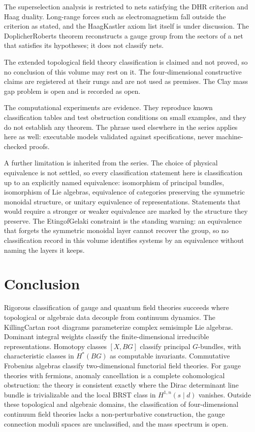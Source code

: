 \documentclass[11pt,letterpaper]{article}
\theoremstyle{definition}
\theoremstyle{remark}
\begin{document}
The superselection analysis is restricted to nets satisfying the DHR criterion and Haag duality. Long-range forces such as electromagnetism fall outside the criterion as stated, and the Haag\textendash{}Kastler axiom list itself is under discussion. The Doplicher\textendash{}Roberts theorem reconstructs a gauge group from the sectors of a net that satisfies its hypotheses; it does not classify nets.

The extended topological field theory classification is claimed and not proved, so no conclusion of this volume may rest on it. The four-dimensional constructive claims are registered at their rungs and are not used as premises. The Clay mass gap problem is open and is recorded as open.

The computational experiments are evidence. They reproduce known classification tables and test obstruction conditions on small examples, and they do not establish any theorem. The phrase used elsewhere in the series applies here as well: executable models validated against specifications, never machine-checked proofs.

A further limitation is inherited from the series. The choice of physical equivalence is not settled, so every classification statement here is classification up to an explicitly named equivalence: isomorphism of principal bundles, isomorphism of Lie algebras, equivalence of categories preserving the symmetric monoidal structure, or unitary equivalence of representations. Statements that would require a stronger or weaker equivalence are marked by the structure they preserve. The Etingof\textendash{}Gelaki constraint is the standing warning: an equivalence that forgets the symmetric monoidal layer cannot recover the group, so no classification record in this volume identifies systems by an equivalence without naming the layers it keeps.

\section{Conclusion}
\label{sec:conclusion}

Rigorous classification of gauge and quantum field theories succeeds where topological or algebraic data decouple from continuum dynamics. The Killing\textendash{}Cartan root diagrams parameterize complex semisimple Lie algebras. Dominant integral weights classify the finite-dimensional irreducible representations. Homotopy classes $[X, BG]$ classify principal $G$-bundles, with characteristic classes in $H^*(BG)$ as computable invariants. Commutative Frobenius algebras classify two-dimensional functorial field theories. For gauge theories with fermions, anomaly cancellation is a complete cohomological obstruction: the theory is consistent exactly where the Dirac determinant line bundle is trivializable and the local BRST class in $H^{1,n}(s\mid d)$ vanishes. Outside these topological and algebraic domains, the classification of four-dimensional continuum field theories lacks a non-perturbative construction, the gauge connection moduli spaces are unclassified, and the mass spectrum is open.
\end{document}
